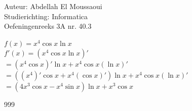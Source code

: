 \documentclass[a4paper]{article}
\begin{document}
  
\noindent \large Auteur: Abdellah El Moussaoui \\
\noindent \large Studierichting: Informatica\\
\noindent \large Oefeningenreeks 3A nr. 40.3\\

\medskip

\normalsize

$f(x)=x^4\cos x \ln x$\\

$ f'(x)=\left(x^4\cos x \ln x\right)'$\\

$= \left(x^4\cos x\right)'\ln x+x^4\cos x \left(\ln x\right)'$\\

$= \left( \left( x^4\right)'\cos x +  x^4 \left(\cos x\right)' \right)\ln x+x^4\cos x \left(\ln x\right)'$\\

$= \left( 4 x^3\cos x -  x^4 \sin x \right)\ln x+x^3\cos x $\\

\begin{thebibliography}{999}
\end{thebibliography}
\end{document}
